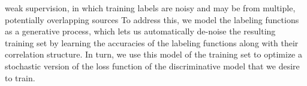 
weak supervision, in which training labels are noisy and may be from
multiple, potentially overlapping sources
To address this, we model the labeling functions as a generative
process, which lets us automatically de-noise the resulting training set by learning the accuracies of
the labeling functions along with their correlation structure. In turn, we use this model of the training
set to optimize a stochastic version of the loss function of the discriminative model that we desire to train. 
